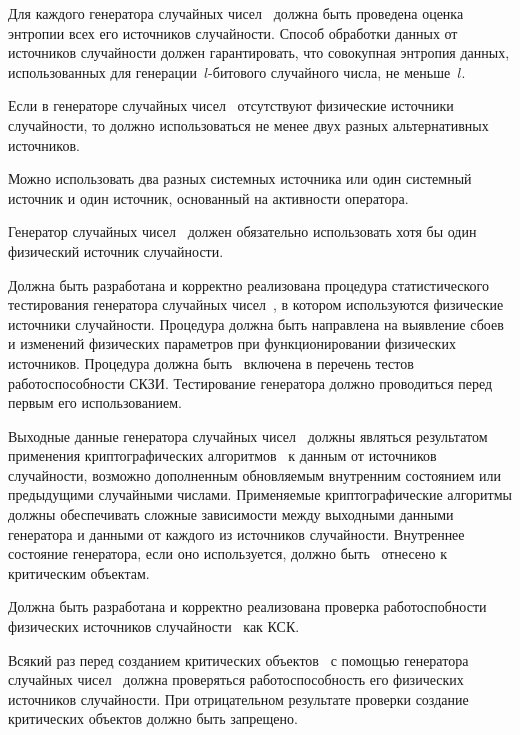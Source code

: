 \label{R.RN.Entropy}
Для каждого генератора случайных чисел~
должна быть проведена оценка энтропии всех его источников случайности. 
%
Способ обработки данных от источников случайности должен гарантировать, 
что совокупная энтропия данных, использованных для генерации~$l$-битового 
случайного числа, не меньше~$l$.

\label{R.RN.Source1}
Если в генераторе случайных чисел~ отсутствуют физические 
источники случайности, то должно использоваться не менее 
двух разных альтернативных источников.

\begin{note*}
Можно использовать два разных системных источника или один системный источник и 
один источник, основанный на активности оператора.
\end{note*}

\label{R.RN.Source2}
Генератор случайных чисел~ должен обязательно
использовать хотя бы один физический источник случайности.

\label{R.RN.Tests}
Должна быть разработана и корректно реализована процедура 
статистического тестирования генератора случайных чисел~, в 
котором используются физические источники случайности. 
%
Процедура должна быть направлена на выявление сбоев и изменений физических
параметров при функционировании физических источников.
%
Процедура должна быть~ включена в перечень тестов 
работоспособности СКЗИ. Тестирование генератора должно проводиться перед 
первым его использованием. 

\label{R.RN.Crypto}
Выходные данные генератора случайных чисел~
должны являться результатом применения криптографических 
алгоритмов~ к данным от источников случайности, 
возможно дополненным обновляемым внутренним состоянием
или предыдущими случайными числами.
%
Применяемые криптографические алгоритмы должны 
обеспечивать сложные зависимости между выходными данными генератора и 
данными от каждого из источников случайности.
%
Внутреннее состояние генератора, если оно используется,
должно быть~ отнесено к критическим объектам.

\label{R.RN.TotTest}
%
Должна быть разработана и корректно реализована проверка
работоспобности физических источников случайности~ 
как КСК.

\label{R.RN.GenCrit}
Всякий раз перед созданием критических объектов~ 
с помощью генератора случайных чисел~ должна проверяться
работоспособность его физических источников случайности. 
%
При отрицательном результате проверки создание критических объектов должно быть 
запрещено.
